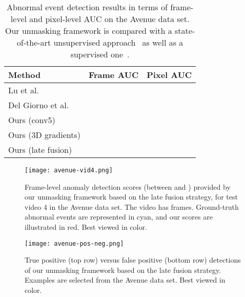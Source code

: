 \documentclass[10pt,twocolumn,letterpaper]{article}
\begin{document}
\begin{table}[t]
\small{
\begin{center}
\begin{tabular}{|l|c|c|}
\hline
Method 																& Frame AUC    	& Pixel AUC 	\\
\hline
\hline
Lu et al.~\cite{Lu-ICCV-2013}								& 			&  \\
Del Giorno et al.~\cite{Giorno-ECCV-2016}			& 			&  \\
\hline
Ours (conv5)														& 			&  \\
Ours (3D gradients)												& 			&  \\
Ours (late fusion)													& 			&  \\
\hline
\end{tabular}
\end{center}
}
\vspace*{-0.1cm}
\caption{Abnormal event detection results in terms of frame-level and pixel-level AUC on the Avenue data set. Our unmasking framework is compared with a state-of-the-art unsupervised approach~\cite{Giorno-ECCV-2016} as well as a supervised one~\cite{Lu-ICCV-2013}.}
\label{tab_Avenue}
\vspace*{-0.2cm}
\end{table}

\begin{figure}
\begin{center}
\texttt{[image: avenue-vid4.png]}
\end{center}
\vspace*{-0.3cm}
\caption{Frame-level anomaly detection scores (between  and ) provided by our unmasking framework based on the late fusion strategy, for test video 4 in the Avenue data set. The video has  frames. Ground-truth abnormal events are represented in cyan, and our scores are illustrated in red. Best viewed in color.}
\label{fig_Avenue_vid4}
\end{figure}

\begin{figure}
\begin{center}
\texttt{[image: avenue-pos-neg.png]}
\end{center}
\vspace*{-0.3cm}
\caption{True positive (top row) versus false positive (bottom row) detections of our unmasking framework based on the late fusion strategy. Examples are selected from the Avenue data set. Best viewed in color.}
\label{fig_Avenue_pos_neg}
\vspace*{-0.3cm}
\end{figure}
\end{document}
